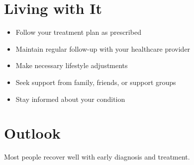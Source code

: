 \section{Living with It}
\begin{itemize}[noitemsep]
  \item Follow your treatment plan as prescribed
  \item Maintain regular follow-up with your healthcare provider
  \item Make necessary lifestyle adjustments
  \item Seek support from family, friends, or support groups
  \item Stay informed about your condition
\end{itemize}
\section{Outlook}
Most people recover well with early diagnosis and treatment.
